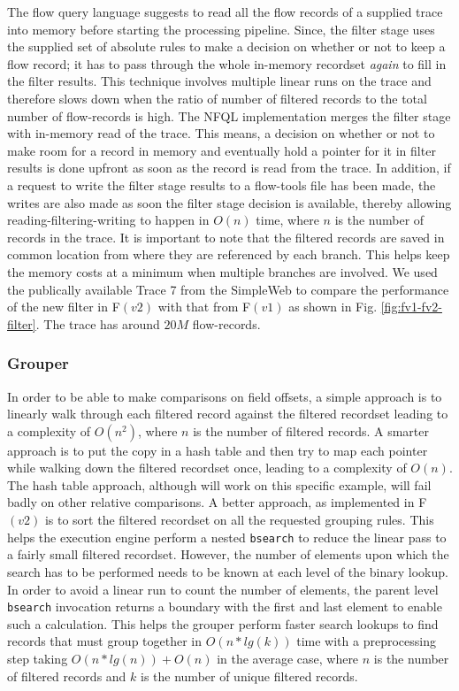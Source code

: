 The flow query language suggests to read all the flow records of a supplied
trace into memory before starting the processing pipeline.  Since, the filter
stage uses the supplied set of absolute rules to make a decision on whether or
not to keep a flow record; it has to pass through the whole in-memory
recordset \emph{again} to fill in the filter results. This technique involves
multiple linear runs on the trace and therefore slows down when the ratio of
number of filtered records to the total number of flow-records is high. The
\ac{NFQL} implementation merges the filter stage with in-memory read of the
trace. This means, a decision on whether or not to make room for a record in
memory and eventually hold a pointer for it in filter results is done upfront
as soon as the record is read from the trace. In addition, if a request to
write the filter stage results to a flow-tools file has been made, the writes
are also made as soon the filter stage decision is available, thereby allowing
reading-filtering-writing to happen in $O(n)$ time, where $n$ is the number of
records in the trace. It is important to note that the filtered records are
saved in common location from where they are referenced by each branch. This
helps keep the memory costs at a minimum when multiple branches are involved.
We used the publically available Trace 7 from the SimpleWeb \cite{simpleweb}
to compare the performance of the new filter in F$(v2)$ with that from F$(v1)$
as shown in Fig. \ref{fig:fv1-fv2-filter}. The trace has around $20M$
flow-records.

\subsubsection{Grouper}

In order to be able to make comparisons on field offsets, a simple approach is
to linearly walk through each filtered record against the filtered recordset
leading to a complexity of $O(n^2)$, where $n$ is the number of filtered
records. A smarter approach is to put the copy in a hash table and then try to
map each pointer while walking down the filtered recordset once, leading to a
complexity of $O(n)$. The hash table approach, although will work on this
specific example, will fail badly on other relative comparisons. A better
approach, as implemented in F$(v2)$ is to sort the filtered recordset on all
the requested grouping rules. This helps the execution engine perform a
nested \texttt{bsearch} to reduce the linear pass to a fairly small filtered
recordset. However, the number of elements upon which the search has to be
performed needs to be known at each level of the binary lookup. In order to
avoid a linear run to count the number of elements, the parent level
\texttt{bsearch} invocation returns a boundary with the first and last element
to enable such a calculation. This helps the grouper perform faster search
lookups to find records that must group together in $O(n*lg(k))$ time with a
preprocessing step taking $O(n*lg(n)) + O(n)$ in the average case, where $n$
is the number of filtered records and $k$ is the number of unique filtered
records.

